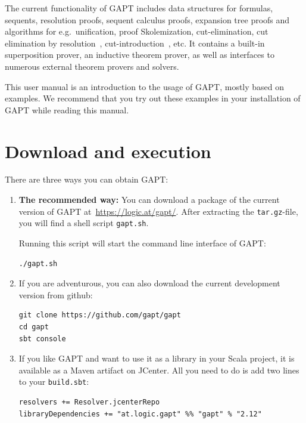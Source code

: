 \documentclass[a4paper,11pt]{book}
\begin{document}
The current functionality of GAPT includes data structures for formulas,
sequents, resolution proofs, sequent calculus proofs, expansion tree proofs and
algorithms for e.g.\ unification, proof Skolemization, cut-elimination, cut
elimination by resolution~\cite{Baaz00CutElimination},
cut-introduction~\cite{Hetzl2012}, etc. It contains a built-in superposition
prover, an inductive theorem prover, as well as interfaces to numerous external
theorem provers and solvers.

This user manual is an introduction to the usage of GAPT, mostly based on examples.
We recommend that you try out these examples in your installation of GAPT while
reading this manual.

\chapter{Download and execution}

There are three ways you can obtain GAPT:

\begin{enumerate}

\item {\bfseries The recommended way:}  You can download a package of the current
version of GAPT at~\url{https://logic.at/gapt/}.  After extracting
the \texttt{tar.gz}-file, you will find a shell script \texttt{gapt.sh}.

Running this script will start the command line interface of GAPT:
\begin{lstlisting}
./gapt.sh
\end{lstlisting}

\item If you are adventurous, you can also download the current development
  version from github:
\begin{lstlisting}
git clone https://github.com/gapt/gapt
cd gapt
sbt console
\end{lstlisting}

\item If you like GAPT and want to use it as a library in your Scala project,
  it is available as a Maven artifact on JCenter.  All you need to do is add
  two lines to your \verb,build.sbt,:
\begin{lstlisting}
resolvers += Resolver.jcenterRepo
libraryDependencies += "at.logic.gapt" %% "gapt" % "2.12"
\end{lstlisting}

\end{enumerate}
\end{document}
